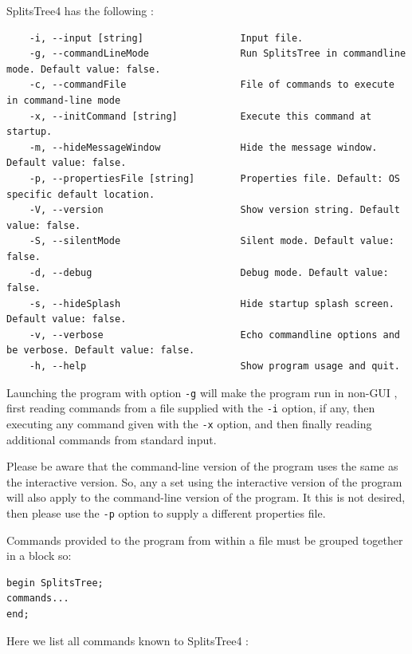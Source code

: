 \documentclass[11pt]{article}
\def\SplitsTree{{\sf SplitsTree4 }}
\begin{document}

\SplitsTree has the following :

\begin{verbatim}
	-i, --input [string]                 Input file. 
	-g, --commandLineMode                Run SplitsTree in commandline mode. Default value: false.
	-c, --commandFile                    File of commands to execute in command-line mode
	-x, --initCommand [string]           Execute this command at startup. 
	-m, --hideMessageWindow              Hide the message window. Default value: false.
	-p, --propertiesFile [string]        Properties file. Default: OS specific default location.
	-V, --version                        Show version string. Default value: false.
	-S, --silentMode                     Silent mode. Default value: false.
	-d, --debug                          Debug mode. Default value: false.
	-s, --hideSplash                     Hide startup splash screen. Default value: false.
	-v, --verbose                        Echo commandline options and be verbose. Default value: false.
	-h, --help                           Show program usage and quit.
\end{verbatim}

Launching the program with option {\tt -g} will make the program run
in non-GUI , first reading commands from a file
supplied with the {\tt -i} option, if any, then executing any
command given with the {\tt -x} option, and then finally reading
additional commands from standard input.

Please be aware that the command-line version of the program uses the same
 as the interactive version.
So, any a  set using
the interactive version of the program will also apply to the command-line
version of the program. It this is not desired, then please use the {\tt -p}
option to supply a different properties file.

Commands provided to the program from within a file must be grouped
together in a  block so:
\begin{verbatim}
begin SplitsTree;
commands...
end;
\end{verbatim}

Here we list all commands known to \SplitsTree:
\end{document}
